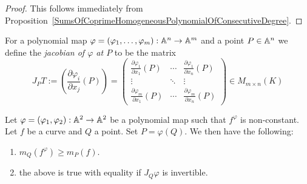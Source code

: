     \begin{proof}
        This follows immediately from Proposition~\ref{SumsOfCoprimeHomogeneousPolynomialOfConsecutiveDegree}.
    \end{proof}
    \begin{definition}
        For a polynomial map $\varphi=(\varphi_1,\dots,\varphi_m): \mathbb{A}^n \rightarrow \mathbb{A}^m$ and a point $P\in \mathbb{A}^n$ we define the \textit{jacobian of $\varphi$ at $P$} to be the matrix
        $$J_P T:= \left(\frac{\partial \varphi_i}{\partial x_j}(P)\right) = \begin{pmatrix}
            \frac{\partial \varphi_1}{\partial x_1}(P) & \cdots & \frac{\partial\varphi_1}{\partial x_n}(P)\\
            \vdots & \ddots & \vdots\\
            \frac{\partial \varphi_m}{\partial x_1}(P) & \cdots & \frac{\partial\varphi_m}{\partial x_n}(P) 
        \end{pmatrix}\in M_{m\times n}(K)$$
    \end{definition}
    \begin{proposition}\label{MultiplicityUnderPolynomialMaps}
        Let $\varphi =(\varphi_1,\varphi_2) : \mathbb{A}^2 \rightarrow \mathbb{A}^2$ be a polynomial map such that $f^\varphi$ is non-constant. Let $f$ be a curve and $Q$ a point. Set $P = \varphi(Q)$. We then have the following:
        \begin{enumerate}
            \item $m_Q(f^\varphi)\geq m_P(f)$.
            \item the above is true with equality if $J_Q \varphi$ is invertible.
        \end{enumerate}
    \end{proposition}
